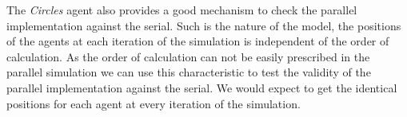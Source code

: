 The \textsl{Circles} agent also provides a good mechanism to check the parallel implementation against the serial. Such is the nature of the model, the positions of the agents at each iteration of the simulation is independent of the order of calculation. As the order of calculation can not be easily prescribed in the parallel simulation we can use this characteristic to test the validity of the parallel implementation against the serial. We would expect to get the identical positions for each agent at every iteration of the simulation.

